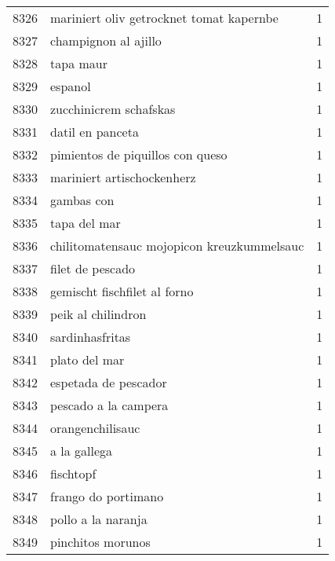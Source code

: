 \begin{tabular}{llr}
8326 &           mariniert oliv getrocknet tomat kapernbe &      1 \\
8327 &                               champignon al ajillo &      1 \\
8328 &                                          tapa maur &      1 \\
8329 &                                            espanol &      1 \\
8330 &                             zucchinicrem schafskas &      1 \\
8331 &                                   datil en panceta &      1 \\
8332 &                   pimientos de piquillos con queso &      1 \\
8333 &                         mariniert artischockenherz &      1 \\
8334 &                                         gambas con &      1 \\
8335 &                                       tapa del mar &      1 \\
8336 &         chilitomatensauc mojopicon kreuzkummelsauc &      1 \\
8337 &                                   filet de pescado &      1 \\
8338 &                       gemischt fischfilet al forno &      1 \\
8339 &                                 peik al chilindron &      1 \\
8340 &                                    sardinhasfritas &      1 \\
8341 &                                      plato del mar &      1 \\
8342 &                               espetada de pescador &      1 \\
8343 &                               pescado a la campera &      1 \\
8344 &                                   orangenchilisauc &      1 \\
8345 &                                       a la gallega &      1 \\
8346 &                                          fischtopf &      1 \\
8347 &                                frango do portimano &      1 \\
8348 &                                 pollo a la naranja &      1 \\
8349 &                                  pinchitos morunos &      1 \\

\end{tabular}
